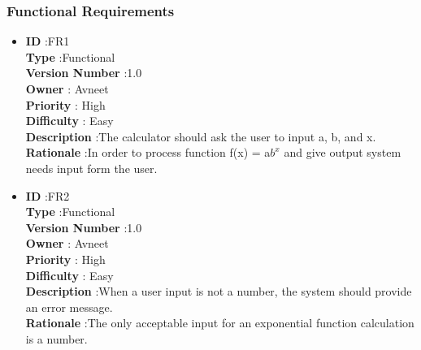 \documentclass[a4paper,12pt]{report}
\begin{document}
\subsubsection{Functional Requirements}
\begin{itemize}
    \item
    \textbf{ID } \hspace{3cm} :FR1  \\
	\textbf{Type } \hspace{2.4cm}  :Functional\\
	\textbf{Version Number} \hspace{0.3cm} :1.0  \\
	\textbf{Owner } \hspace{1.98cm} : Avneet \\
	\textbf{Priority } \hspace{1.75cm} : High\\
	\textbf{Difficulty } \hspace{1.5cm} : Easy \\
	\textbf{Description }\hspace{1.2cm} :The calculator should ask the user to input a, b, and x. \\
	\textbf{Rationale }\hspace{1.6cm} :In order to process function f(x) = a$b^x$ and give output system needs input form the user. \\

	\item
    \textbf{ID } \hspace{3cm} :FR2  \\
	\textbf{Type } \hspace{2.4cm}  :Functional\\
	\textbf{Version Number} \hspace{0.3cm} :1.0  \\
	\textbf{Owner } \hspace{1.98cm} : Avneet \\
	\textbf{Priority } \hspace{1.75cm} : High\\
	\textbf{Difficulty } \hspace{1.5cm} : Easy\\
	\textbf{Description }\hspace{1.2cm} :When a user input is not a number, the system should provide an error message. \\
	\textbf{Rationale }\hspace{1.6cm} :The only acceptable input for an exponential function calculation is a number. \\


\end{itemize}
\end{document}
